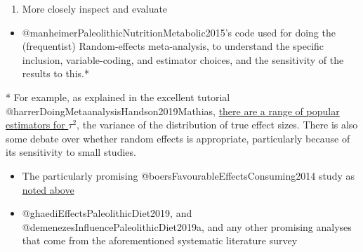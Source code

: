 \documentclass[]{article}
\providecommand{\tightlist}{%
  \setlength{\itemsep}{0pt}\setlength{\parskip}{0pt}}
\begin{document}
\hfill\break

\begin{enumerate}
\def\labelenumi{\arabic{enumi}.}
\setcounter{enumi}{3}
\tightlist
\item
  More closely inspect and evaluate
\end{enumerate}

\begin{itemize}
\tightlist
\item
  @manheimerPaleolithicNutritionMetabolic2015's code used for doing the
  (frequentist) Random-effects meta-analysis, to understand the specific
  inclusion, variable-coding, and estimator choices, and the sensitivity
  of the results to this.*
\end{itemize}

* For example, as explained in the excellent tutorial
@harrerDoingMetaanalysisHandson2019Mathias,
\href{https://bookdown.org/MathiasHarrer/Doing_Meta_Analysis_in_R/random.html\#tau2}{there
are a range of popular estimators for \(\tau^2\)}, the variance of the
distribution of true effect sizes. There is also some debate over
whether random effects is appropriate, particularly because of its
sensitivity to small studies.

\begin{itemize}
\item
  The particularly promising @boersFavourableEffectsConsuming2014 study
  as \protect\hyperlink{boers}{noted above}
\item
  @ghaediEffectsPaleolithicDiet2019, and
  @demenezesInfluencePaleolithicDiet2019a, and any other promising
  analyses that come from the aforementioned systematic literature
  survey
\end{itemize}
\end{document}
